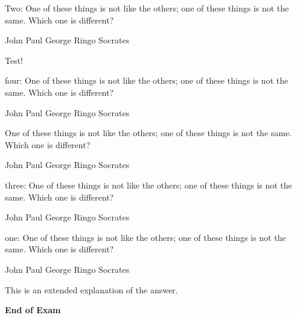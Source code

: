 \documentclass[]{exam}
\newcommand{\sol}[1]{{\ifprintanswers \color{red} #1 \fi}}
\newcommand{\questionp}[1]{\begin{minipage}{\textwidth}
  \question #1
  \end{minipage}}
\begin{document}
\begin{questions}




\questionp{
Two: One of these things is not like the others; one of these
things is not the same. Which one is different?

\begin{randomizechoices}
\choice John
\choice Paul
\choice George
\choice Ringo
\CorrectChoice Socrates
\end{randomizechoices}

\sol{Test!}
}

\questionp{
four: One of these things is not like the others; one of these
things is not the same. Which one is different?

\begin{randomizechoices}
\choice John
\choice Paul
\choice George
\choice Ringo
\CorrectChoice Socrates
\end{randomizechoices}
}

\questionp{
One of these things is not like the others; one of these
things is not the same. Which one is different?

\begin{randomizechoices}
\choice John
\choice Paul
\choice George
\choice Ringo
\CorrectChoice Socrates
\end{randomizechoices}
}

\questionp{
three: One of these things is not like the others; one of these
things is not the same. Which one is different?

\begin{randomizechoices}
\choice John
\choice Paul
\choice George
\choice Ringo
\CorrectChoice Socrates
\end{randomizechoices}
}

\questionp{
one: One of these things is not like the others; one of these
things is not the same. Which one is different?

\begin{randomizechoices}
\choice John
\choice Paul
\choice George
\choice Ringo
\CorrectChoice Socrates
\end{randomizechoices}
\sol{This is an extended explanation of the answer.}
}



\end{questions}


\vspace*{\fill}
\Huge \begin{center} \textbf{End of Exam} \end{center}
\end{document}
